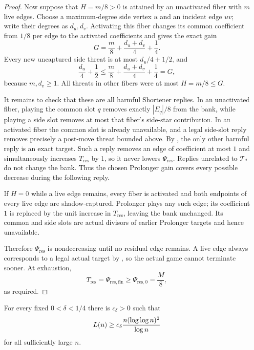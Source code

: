 \begin{proof}
Now suppose that $H=m/8>0$ is attained by an unactivated fiber with $m$ live
edges.  Choose a maximum-degree side vertex $u$ and an incident edge $uv$;
write their degrees as $d_u,d_v$.  Activating this fiber changes its common
coefficient from $1/8$ per edge to the activated coefficients and gives the
exact gain
\[
  G=\frac m8+\frac{d_u+d_v}{4}+\frac14.
\]
Every new uncaptured side threat is at most $d_u/4+1/2$, and
\[
  \frac{d_u}{4}+\frac12
  \le
  \frac m8+\frac{d_u+d_v}{4}+\frac14=G,
\]
because $m,d_v\ge1$.  All threats in other fibers were at most
$H=m/8\le G$.

It remains to check that these are all harmful Shortener replies.  In an
unactivated fiber, playing the common slot $q$ removes exactly
$|E_q|/8$ from the bank, while playing a side slot removes at most that
fiber's side-star contribution.  In an activated fiber the common slot is
already unavailable, and a legal side-slot reply removes precisely a
post-move threat bounded above.  By
, the only other harmful reply is an exact
target.  Such a reply removes an edge of coefficient at most $1$ and
simultaneously increases $T_{\mathrm{res}}$ by $1$, so it never lowers
$\Psi_{\mathrm{res}}$.  Replies unrelated to $\mathcal T_*$ do not change the
bank.  Thus the chosen Prolonger gain covers every possible decrease during
the following reply.

If $H=0$ while a live edge remains, every fiber is activated and both
endpoints of every live edge are shadow-captured.  Prolonger plays any such
edge; its coefficient $1$ is replaced by the unit increase in
$T_{\mathrm{res}}$, leaving the bank unchanged.  Its common and side slots
are actual divisors of earlier Prolonger targets and hence unavailable.

Therefore $\Psi_{\mathrm{res}}$ is nondecreasing until no residual edge
remains.  A live edge always corresponds to a legal actual target by
, so the actual game cannot terminate sooner.
At exhaustion,
\[
  T_{\mathrm{res}}
  =\Psi_{\mathrm{res,fin}}
  \ge\Psi_{\mathrm{res},0}
  =\frac M8,
\]
as required.
\end{proof}

\begin{proposition}\label{prop:t2-final}
For every fixed $0<\delta<1/4$ there is $c_\delta>0$ such that
\[
  L(n)\ge c_\delta\frac{n(\log\log n)^2}{\log n}
\]
for all sufficiently large $n$.
\end{proposition}

